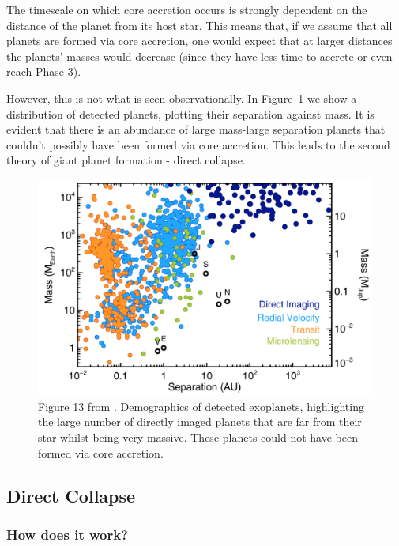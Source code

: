 \documentclass[twocolumn]{aastex631}
\begin{document}
The timescale on which core accretion occurs is strongly dependent on the distance of the planet from its host star. This means that, if we assume that all planets are formed via core accretion, one would expect that at larger distances the planets' masses would decrease (since they have less time to accrete or even reach Phase 3).

However, this is not what is seen observationally. In Figure~\ref{fig:demographics} we show a distribution of detected planets, plotting their separation against mass. It is evident that there is an abundance of large mass-large separation planets that couldn't possibly have been formed via core accretion. This leads to the second theory of giant planet formation - direct collapse.

\begin{figure}[tb]
    \centering
    \includegraphics[width=\columnwidth]{exoplanet_demographics.png}
    \caption{Figure 13 from \citet{Bowler+2016}. Demographics of detected exoplanets, highlighting the large number of directly imaged planets that are far from their star whilst being very massive. These planets could not have been formed via core accretion.}
    \label{fig:demographics}
\end{figure}

\subsection{Direct Collapse}

\subsubsection{How does it work?}
\end{document}
